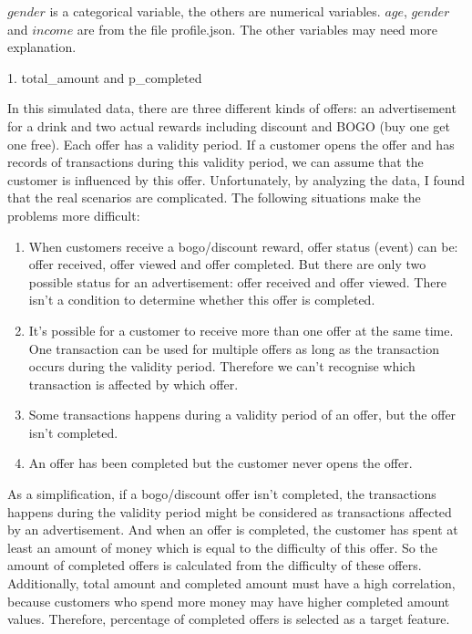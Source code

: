 \documentclass[a4paper,12pt]{article}
\begin{document}
$gender$ is a categorical variable, the others are numerical variables. $age$, $gender$ and $income$ are from the file 
profile.json. The other variables may need more explanation. 

1. total\_amount and p\_completed

In this simulated data, there are three different kinds of offers: an advertisement for a drink and two actual rewards including 
discount and BOGO (buy one get one free). Each offer has a validity period. If a customer opens the offer and has records of 
transactions during this validity period, we can assume that the customer is influenced by this offer. Unfortunately, by 
analyzing the data, I found that the real scenarios are complicated. The following situations make the problems more difficult:

\begin{enumerate}[1)]

    \item When customers receive a bogo/discount reward, offer status (event) can be: offer received, offer viewed and offer 
    completed. But there are only two possible status for an advertisement: offer received and offer viewed. There isn't a 
    condition to determine whether this offer is completed. 

    \item It's possible for a customer to receive more than one offer at the same time. One transaction can be used for multiple 
    offers as long as the transaction occurs during the validity period. Therefore we can't recognise which transaction is 
    affected by which offer.

    \item Some transactions happens during a validity period of an offer, but the offer isn't completed.
    
    \item An offer has been completed but the customer never opens the offer.

\end{enumerate}

As a simplification, if a bogo/discount offer isn't completed, the transactions happens during the validity period might be 
considered as transactions affected by an advertisement. And when an offer is completed, the customer has spent at least an 
amount of money which is equal to the difficulty of this offer. So the amount of completed offers is calculated from the 
difficulty of these offers. Additionally, total amount and completed amount must have a high correlation, because customers who 
spend more money may have higher completed amount values. Therefore, percentage of completed offers is selected as a target 
feature.
\end{document}

